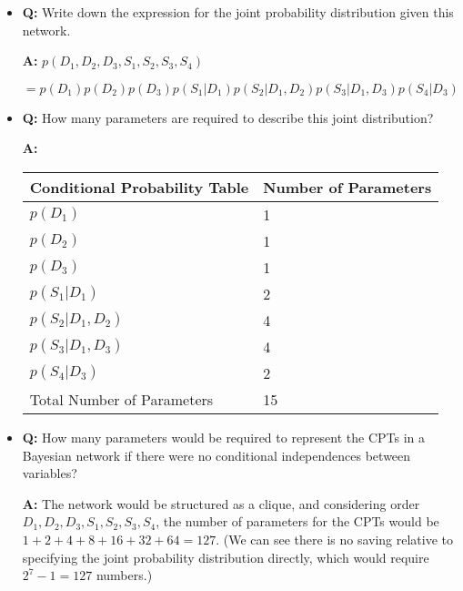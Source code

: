 \documentclass[11pt,letterpaper]{article}
\begin{document}
\begin{itemize}

\item \textbf{Q:} Write down the expression for the joint probability distribution 
given this network. 

\begin{solution}
\textbf{A:} $p(D_1, D_2, D_3, S_1, S_2, S_3, S_4) $

 $= p(D_1)p(D_2)p(D_3)p(S_1|D_1)p(S_2|D_1,D_2)p(S_3|D_1,D_3)p(S_4|D_3)$\\
\end{solution}


\item \textbf{Q:} How many parameters are required to describe this joint distribution? 

\begin{solution}
\textbf{A:} 
%
\begin{center}
\begin{tabular}{|l|l|}
\hline
{Conditional Probability Table}&{Number of Parameters} \\
\hline
\hline
$p(D_1)$&1\\
$p(D_2)$&1\\
$p(D_3)$&1\\
$p(S_1|D_1)$&2\\
$p(S_2|D_1,D_2)$&4\\
$p(S_3|D_1,D_3)$&4\\
$p(S_4|D_3)$&2\\
\hline
\hline
Total Number of Parameters&15\\
\hline
\end{tabular}
\end{center} 
\end{solution}


\item \textbf{Q:} How many parameters would be required to represent the CPTs in a Bayesian network
if there were no conditional independences between variables? 

\begin{solution}
\textbf{A:} The network would be structured as a clique, and considering order $D_1, D_2, D_3, S_1, S_2, S_3, S_4$,
the number of parameters for the CPTs would be $1+2+4+8+16+32+64=127$. (We can see there is no saving
relative to specifying the joint probability distribution directly, which would require $2^7-1=127$ numbers.)\\
\end{solution}


\end{itemize}
\end{document}

